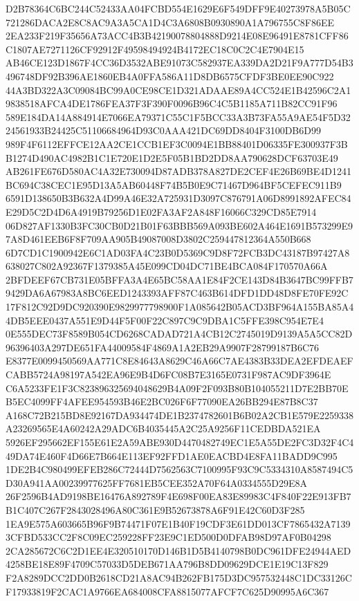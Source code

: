 \documentclass[UTF8,fontset=fandol,zihao=-4,a4paper]{ctexart}
\begin{document}
{{D2B78364C6BC244C52433AA04FCBD554E1629E6F549DFF9E40273978A5B05C721286DACA2E8C8AC9A3A5CA1D4C3A6808B0930890A1A796755C8F86EE
2EA233F219F35656A73ACC4B3B42190078804888D9214E08E96491E8781CFF86C1807AE7271126CF92912F49598494924B4172EC18C0C2C4E7904E15
AB46CE123D1867F4CC36D3532ABE91073C582937EA339DA2D21F9A777D54B3496748DF92B396AE1860EB4A0FFA586A11D8DB6575CFDF3BE0EE90C922
44A3BD322A3C09084BC99A0CE98CE1D321ADAAE89A4CC524E1B42596C2A19838518AFCA4DE1786FEA37F3F390F0096B96C4C5B1185A711B82CC91F96
589E184DA14A884914E7066EA79371C55C1F5BCC33A3B73FA55A9AE54F5D3224561933B24425C51106684964D93C0AAA421DC69DD8404F3100DB6D99
989F4F6112EFFCE12AA2CE1CCB1EF3C0094E1BB88401D06335FE300937F3BB1274D490AC4982B1C1E720E1D2E5F05B1BD2DD8AA790628DCF63703E49
AB261FE676D580AC4A32E730094D87ADB378A827DE2CEF4E26B69BE4D1241BC694C38CEC1E95D13A5AB60448F74B5B0E9C71467D964BF5CEFEC911B9
6591D138650B3B632A4D99A46E32A725931D3097C876791A06D8991892AFEC84E29D5C2D4D6A4919B79256D1E02FA3AF2A848F16066C329CD85E7914
06D827AF1330B3FC30CB0D21B01F63BBB569A093BE602A464E1691B573299E97A8D461EEB6F8F709AA905B49087008D3802C259447812364A550B668
6D7CD1C1900942E6C1AD03FA4C23B0D5369C9D8F72FCB3DC43187B97427A8638027C802A92367F1379385A45E099CD04DC71BE4BCA084F170570A66A
2BFDEEF67CB731E05BFFA3A4E65BC58AA1E84F2CE143D84B3647BC99FFB79429DA6A67983A8BC6EED1243393AFF87C463B614DFD1DD48D8FE70FE92C
17F812C92D9DC920390E9829977798900F1A085642B05ACD3BF964A155BA85A44DB5EEE0437A551E9D44F5F00F22C897C9C9DBA1C5FFE398C954E7E4
0E555DEC73F8589B054CD6268CADAD721A4CB12C2745019D9139A5A5CC82D96396403A297DE651FA44009584F4869A1A2EB29A9907F28799187B6C76
E8377E0099450569AA771C8E84643A8629C46A66C7AE4383B33DEA2EFDEAEFCABB5724A98197A542EA96E9B4D6FC08B7E3165E0731F987AC9DF3964E
C6A5233FE1F3C823896325694048629B4A09F2F093B80B104055211D7E2BB70EB5EC4099FF4AFEE954593B46E2BC026F6F77090EA26BB294E87B8C37
A168C72B215BD8E92167DA934474DE1B2374782601B6B02A2CB1E579E2259338A23269565E4A60242A29ADC6B4035445A2C25A9256F11CEDBDA521EA
5926EF295662EF155E61E2A59ABE930D4470482749EC1E5A55DE2FC3D32F4C449DA74E460F4D66E7B664E113EF92FFD1AE0EACBD4E8FA11BADD9C995
1DE2B4C980499EFEB286C72444D7562563C7100995F93C9C5334310A8587494C5D30A941AA00239977625FF7681EB5CEE352A70F64A0334555D29E8A
26F2596B4AD9198BE16476A892789F4E698F00EA83E89983C4F840F22E913FB7B1C407C267F2843028496A80C361E9B52673878A6F91E42C60D3F285
1EA9E575A603665B96F9B74471F07E1B40F19CDF3E61DD013CF7865432A71393CFBD533CC2F8C09EC259228FF23E9C1ED500D0DFAB98D97AF0B04298
2CA285672C6C2D1EE4E320510170D146B1D5B4140798B0DC961DFE24944AED4258BE18E89F4709C57033D5DEB671AA796B8DD09629DCE1E19C13F829
F2A8289DCC2DD0B2618CD21A8AC94B262FB175D3DC957532448C1DC33126CF17933819F2CAC1A9766EA684008CFA8815077AFCF7C625D90995A6C367
}}
\end{document}
